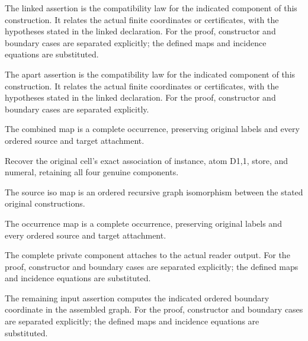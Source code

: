 The linked assertion is the compatibility law for the indicated component of this construction. It relates the actual finite coordinates or certificates, with the hypotheses stated in the linked declaration.
For the proof, constructor and boundary cases are separated explicitly; the defined maps and incidence equations are substituted.
\par{}

The apart assertion is the compatibility law for the indicated component of this construction. It relates the actual finite coordinates or certificates, with the hypotheses stated in the linked declaration.
For the proof, constructor and boundary cases are separated explicitly.
\par{}

The combined map is a complete occurrence, preserving original labels and every ordered source and target attachment.
\par{}

Recover the original cell's exact association of instance, atom D1,1, store, and numeral, retaining all four genuine components.
\par{}

The source iso map is an ordered recursive graph isomorphism between the stated original constructions.
\par{}

The occurrence map is a complete occurrence, preserving original labels and every ordered source and target attachment.
\par{}

The complete private component attaches to the actual reader output.
For the proof, constructor and boundary cases are separated explicitly; the defined maps and incidence equations are substituted.
\par{}

The remaining input assertion computes the indicated ordered boundary coordinate in the assembled graph.
For the proof, constructor and boundary cases are separated explicitly; the defined maps and incidence equations are substituted.
\par{}


